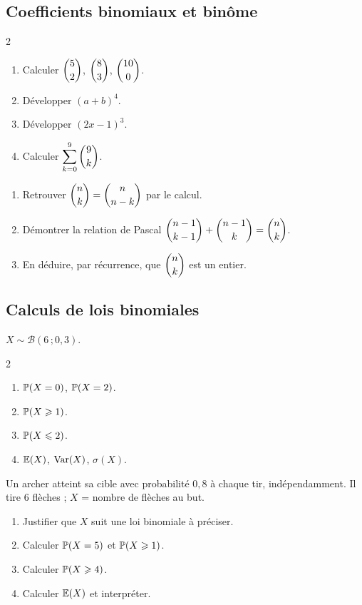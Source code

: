 \subsection{Coefficients binomiaux et binôme}

\begin{multicols}{2}
\begin{enumerate}
	\item Calculer $\dbinom{5}{2}$, $\dbinom{8}{3}$, $\dbinom{10}{0}$.
	\item Développer $(a+b)^4$.
	\item Développer $(2x-1)^3$.
	\item Calculer $\displaystyle\sum_{k=0}^{9}\dbinom{9}{k}$.
\end{enumerate}
\end{multicols}

\begin{enumerate}
	\item Retrouver $\dbinom{n}{k}=\dbinom{n}{n-k}$ par le calcul.
	\item Démontrer la relation de Pascal
	$\dbinom{n-1}{k-1}+\dbinom{n-1}{k}=\dbinom{n}{k}$.
	\item En déduire, par récurrence, que $\dbinom{n}{k}$ est un entier.
\end{enumerate}

\subsection{Calculs de lois binomiales}

$X\sim\mathscr{B}(6\,;0{,}3)$.
\begin{multicols}{2}
\begin{enumerate}
	\item $\mathbb{P}(X=0)$, $\mathbb{P}(X=2)$.
	\item $\mathbb{P}(X\geqslant 1)$.
	\item $\mathbb{P}(X\leqslant 2)$.
	\item $\mathbb{E}(X)$, $\mathrm{Var}(X)$, $\sigma(X)$.
\end{enumerate}
\end{multicols}

Un archer atteint sa cible avec probabilité $0{,}8$ à chaque tir,
indépendamment. Il tire $6$ flèches ; $X$ = nombre de flèches au but.
\begin{enumerate}
	\item Justifier que $X$ suit une loi binomiale à préciser.
	\item Calculer $\mathbb{P}(X=5)$ et $\mathbb{P}(X\geqslant 1)$.
	\item Calculer $\mathbb{P}(X\geqslant 4)$.
	\item Calculer $\mathbb{E}(X)$ et interpréter.
\end{enumerate}

